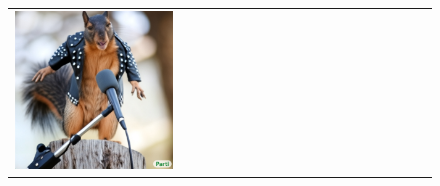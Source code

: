\begin{figure}[ht!]
\begin{adjustwidth}{-0.8in}{-0.5in}
\begin{tabular}{cccccccccccccccccccc}
\multicolumn{2}{c}{\includegraphics[width=\threebythreecolwidth\textwidth]{figures/cherries/rock_squirrel_2.jpg}} &&


\end{tabular}
\end{adjustwidth}
\end{figure}
